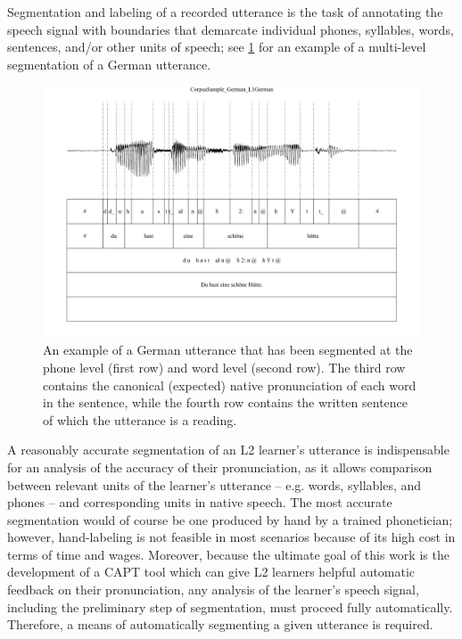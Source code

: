 
Segmentation
and labeling
of a recorded utterance is the task of annotating the speech signal with boundaries that demarcate individual phones, syllables, words, sentences, and/or other units of speech; see \cref{fig:GGsegmentation} for an example of a multi-level segmentation of a German utterance. 
	
	\begin{figure}
		\centering
		\includegraphics[width=\textwidth]{img/screenshots/SampleGG-basic}
		\caption[An example German utterance and its segmentation]{ An example of a German utterance that has been segmented at the phone level (first row) and word level (second row). The third row contains the canonical (expected) native pronunciation of each word in the sentence, while the fourth row contains the written sentence of which the utterance is a reading.}
		\label{fig:GGsegmentation}
	\end{figure}


A reasonably accurate segmentation of an L2 learner's utterance is indispensable for an analysis of the accuracy of their pronunciation, 
as it allows comparison between relevant units of the learner's utterance -- e.g. words, syllables, and phones -- and corresponding units in native speech. 
The most accurate segmentation would of course be one produced by hand by a trained phonetician; however, hand-labeling is not feasible in most scenarios because of its high cost in terms of time and wages. Moreover, because the ultimate goal of this work is the development of a CAPT tool which can give L2 learners helpful automatic feedback on their pronunciation, 
any analysis of the learner's speech signal, including the preliminary step of segmentation, must proceed fully automatically. Therefore, a means of automatically segmenting a given utterance is required.



